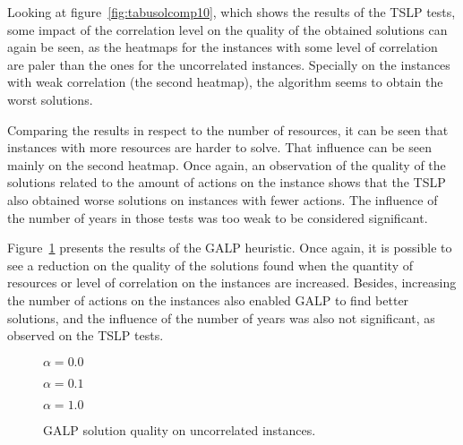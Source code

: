 Looking at figure~\ref{fig:tabusolcomp10}, which shows the results of the TSLP tests, some impact of
the correlation level on the quality of the obtained solutions can again be seen, as the heatmaps for the instances with some level of correlation
are paler than the ones for the uncorrelated instances. Specially on the instances with weak correlation (the second heatmap), the algorithm seems
to obtain the worst solutions.

Comparing the results in respect to the number of resources, it can be seen that instances with more resources are harder to solve. That influence
can be seen mainly on the second heatmap. Once again, an observation of the quality of the solutions related to the amount of actions on the instance
shows that the TSLP also obtained worse solutions on instances with fewer actions. The influence of the number of years in those tests was too weak to be 
considered significant.

Figure~\ref{fig:greedysolcomp10} presents the results of the GALP heuristic.
Once again, it is possible to see a reduction on the quality of the solutions found when the quantity of resources or level of correlation on
the instances are increased. Besides, increasing the number of actions on the instances also enabled GALP to find better solutions, and
the influence of the number of years was also not significant, as observed on the TSLP tests.

\figpar
\begin{figure}[H]
  \centering
  \resizebox{\columnwidth}{!}{%
    \subfloat[1 resource]{} 
    \subfloat[2 resources]{}
    \subfloat[4 resources]{} 
  }
  $\alpha = 0.0$
\end{figure}

\figspaces
\begin{figure}[H]
  \centering
  \resizebox{\columnwidth}{!}{%
    \subfloat[1 resource]{} 
    \subfloat[2 resources]{}
    \subfloat[4 resources]{}
  }
  $\alpha = 0.1$
\end{figure}

\figspaces
\begin{figure}[H]
  \centering
  \resizebox{\columnwidth}{!}{%
    \subfloat[1 resource]{} 
    \subfloat[2 resources]{}
    \subfloat[4 resources]{}
  }
  $\alpha = 1.0$
  \caption{GALP solution quality on uncorrelated instances.}
  \label{fig:greedysolcomp10}
\end{figure}

